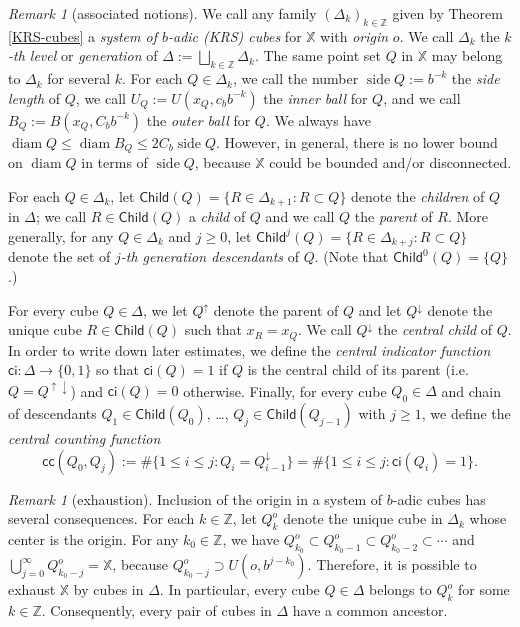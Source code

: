 \documentclass[12pt]{amsart}
\theoremstyle{definition}
\theoremstyle{remark}
\newtheorem{remark}[theorem]{Remark}
\newcommand{\ZZ}{\mathbb{Z}}
\newcommand{\XX}{\mathbb{X}}
\newcommand{\diam}{\mathop\mathrm{diam}\nolimits}
\newcommand{\side}{\mathop\mathrm{side}\nolimits}
\newcommand{\Child}{\mathsf{Child}}
\numberwithin{figure}{section}
\numberwithin{equation}{section}
\begin{document}
\begin{remark}[associated notions] \label{r:KRS} We call any family $(\Delta_k)_{k\in\ZZ}$  given by Theorem \ref{KRS-cubes} a \emph{system of $b$-adic (KRS) cubes} for $\XX$ with \emph{origin} $o$. We call $\Delta_k$ the \emph{$k$-th level} or \emph{generation} of $\Delta:=\bigsqcup_{k\in\ZZ}\Delta_k$. The same point set $Q$ in $\XX$ may belong to $\Delta_k$ for several $k$. For each $Q\in\Delta_k$, we call the number $\side Q:=b^{-k}$ the \emph{side length} of $Q$, we call $U_Q:=U(x_Q,c_b b^{-k})$ the \emph{inner ball} for $Q$, and we call $B_Q:= B(x_Q, C_bb^{-k})$ the \emph{outer ball} for $Q$. We always have $\diam Q\leq \diam B_Q\leq 2C_b \side Q.$ However, in general, there is no lower bound on $\diam Q$ in terms of $\side Q$, because $\XX$ could be bounded and/or disconnected.

For each $Q\in\Delta_k$, let $\Child(Q)=\{R\in\Delta_{k+1}:R\subset Q\}$ denote the \emph{children} of $Q$ in $\Delta$; we call $R\in\Child(Q)$ a \emph{child} of $Q$ and we call $Q$ the \emph{parent} of $R$. More generally, for any $Q\in\Delta_k$ and $j\geq 0$, let $\Child^j(Q)=\{R\in\Delta_{k+j}:R\subset Q\}$ denote the set of \emph{$j$-th generation descendants} of $Q$. (Note that $\Child^0(Q)=\{Q\}$.)

For every cube $Q\in\Delta$, we let $Q^\uparrow$ denote the parent of $Q$ and let $Q^\downarrow$ denote the unique cube $R\in \Child(Q)$ such that $x_R=x_Q$. We call $Q^\downarrow$ the \emph{central child} of $Q$. In order to write down later estimates, we define the \emph{central indicator function} $\mathsf{ci}:\Delta\rightarrow \{0,1\}$ so that $\mathsf{ci}(Q)=1$ if $Q$ is the central child of its parent (i.e.~$Q=Q^{\uparrow\downarrow}$) and $\mathsf{ci}(Q)=0$ otherwise. Finally, for every cube $Q_0\in \Delta$ and chain of descendants $Q_1\in\Child(Q_0)$, \dots, $Q_j\in\Child(Q_{j-1})$ with $j\geq 1$, we define the \emph{central counting function} \begin{equation}\label{cc-def}\mathsf{cc}(Q_0,Q_j):=\#\{1\leq i\leq j: Q_{i}=Q_{i-1}^{\downarrow}\}=\#\{1\leq i\leq j:\mathsf{ci}(Q_i)=1\}.\end{equation}\end{remark}

\begin{remark}[exhaustion] \label{r:exhaustive} Inclusion of the origin in a system of $b$-adic cubes has several consequences. For each $k\in\ZZ$, let $Q^o_k$ denote the unique cube in $\Delta_k$ whose center is the origin. For any $k_0\in\ZZ$, we have $Q^o_{k_0}\subset Q^o_{k_0-1}\subset Q^o_{k_0-2}\subset\cdots$ and $\bigcup_{j=0}^\infty Q^o_{k_0-j}=\XX$, because $Q^o_{k_0-j}\supset U(o,b^{j-k_0})$. Therefore, it is possible to exhaust $\XX$ by cubes in $\Delta$. In particular, every cube $Q\in \Delta$ belongs to $Q^o_k$ for some $k\in\ZZ$. Consequently, every pair of cubes in $\Delta$ have a common ancestor. \end{remark}
\end{document}
